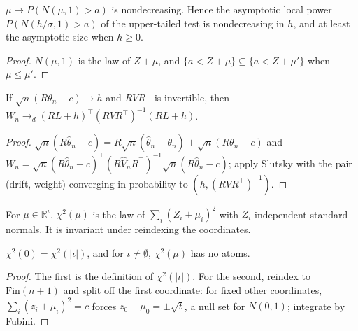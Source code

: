 \begin{lemma}
\label{lem:local-power-mono}
\leanok
$\mu\mapsto P(N(\mu,1) > a)$ is nondecreasing. Hence the asymptotic local power $P(N(h/\sigma,1) > a)$ of the
upper-tailed test is nondecreasing in $h$, and at least the asymptotic size when $h\ge0$.
\end{lemma}
\begin{proof}
\leanok
$N(\mu,1)$ is the law of $Z+\mu$, and $\{a < Z+\mu\}\subseteq\{a < Z+\mu'\}$ when $\mu\le\mu'$.
\end{proof}

\begin{theorem}
\label{thm:wald-local}
\leanok
{}
If $\sqrt n(R\theta_n-c)\to h$ and $RVR^\top$ is invertible, then $W_n\to_d(RL+h)^\top(RVR^\top)^{-1}(RL+h)$.
\end{theorem}
\begin{proof}
\leanok
$\sqrt n(R\hat\theta_n-c) = R\sqrt n(\hat\theta_n-\theta_n)+\sqrt n(R\theta_n-c)$ and
$W_n = \sqrt n(R\hat\theta_n-c)^\top(R\hat V_nR^\top)^{-1}\sqrt n(R\hat\theta_n-c)$; apply Slutsky with the pair
(drift, weight) converging in probability to $(h,(RVR^\top)^{-1})$.
\end{proof}

\begin{definition}
\label{def:nc-chi-squared}
\leanok
{}
For $\mu\in\mathbb R^\iota$, $\chi^2(\mu)$ is the law of $\sum_i(Z_i+\mu_i)^2$ with $Z_i$ independent standard normals.
It is invariant under reindexing the coordinates.
\end{definition}

\begin{lemma}
\label{lem:nc-chi-squared-props}
\leanok
{}
$\chi^2(0) = \chi^2(|\iota|)$, and for $\iota\neq\emptyset$, $\chi^2(\mu)$ has no atoms.
\end{lemma}
\begin{proof}
\leanok
The first is the definition of $\chi^2(|\iota|)$. For the second, reindex to $\mathrm{Fin}(n+1)$ and split off the first
coordinate: for fixed other coordinates, $\sum_i(z_i+\mu_i)^2 = c$ forces $z_0+\mu_0 = \pm\sqrt t$, a null set for $N(0,1)$;
integrate by Fubini.
\end{proof}


